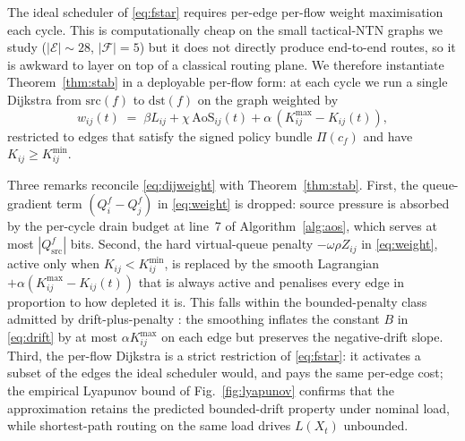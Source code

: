 \documentclass[conference]{IEEEtran}
\begin{document}
The ideal scheduler of \eqref{eq:fstar} requires per-edge per-flow
weight maximisation each cycle.  This is computationally cheap on
the small tactical-NTN graphs we study ($|\mathcal{E}|\!\sim\!28$,
$|\mathcal{F}|\!=\!5$) but it does not directly produce end-to-end
routes, so it is awkward to layer on top of a classical routing
plane.  We therefore instantiate Theorem~\ref{thm:stab} in a
deployable per-flow form: at each cycle we run a single Dijkstra
from $\mathrm{src}(f)$ to $\mathrm{dst}(f)$ on the graph weighted by
\begin{equation}
w_{ij}(t)
 \;=\; \beta L_{ij}
     + \chi\,\mathrm{AoS}_{ij}(t)
     + \alpha\,(K^{\max}_{ij}-K_{ij}(t)),
\label{eq:dijweight}
\end{equation}
restricted to edges that satisfy the signed policy bundle
$\Pi(c_f)$ and have $K_{ij}\ge K^{\min}_{ij}$.

Three remarks reconcile \eqref{eq:dijweight} with
Theorem~\ref{thm:stab}.  First, the queue-gradient term
$(Q^f_i\!-\!Q^f_j)$ in \eqref{eq:weight} is dropped: source pressure
is absorbed by the per-cycle drain budget at line~7 of
Algorithm~\ref{alg:aos}, which serves at most $|Q^f_{\mathrm{src}}|$
bits.  Second, the hard virtual-queue penalty $-\omega\rho Z_{ij}$
in \eqref{eq:weight}, active only when $K_{ij}\!<\!K_{ij}^{\min}$,
is replaced by the smooth Lagrangian
$+\alpha(K^{\max}_{ij}\!-\!K_{ij}(t))$ that is always active and
penalises every edge in proportion to how depleted it is.  This
falls within the bounded-penalty class admitted by drift-plus-penalty
\cite[Sec.~4.5]{neely_book_2010}: the smoothing inflates the constant
$B$ in \eqref{eq:drift} by at most $\alpha K^{\max}_{ij}$ on each
edge but preserves the negative-drift slope.  Third, the per-flow
Dijkstra is a strict restriction of \eqref{eq:fstar}: it activates a
subset of the edges the ideal scheduler would, and pays the same
per-edge cost; the empirical Lyapunov bound of
Fig.~\ref{fig:lyapunov} confirms that the approximation retains the
predicted bounded-drift property under nominal load, while
shortest-path routing on the same load drives $L(X_t)$ unbounded.
\end{document}
